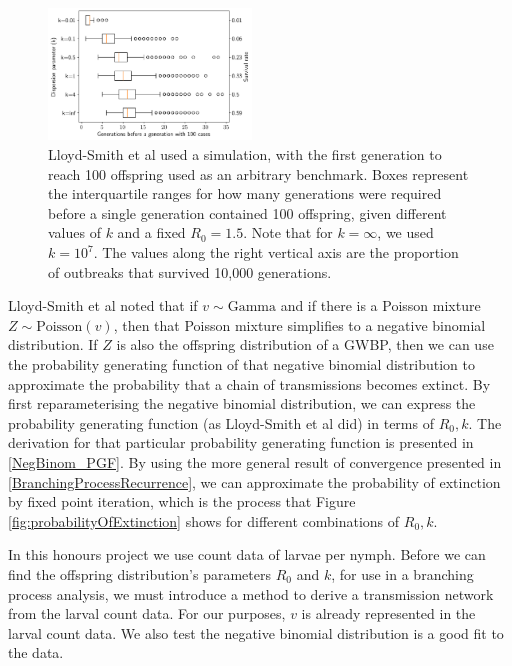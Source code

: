 \documentclass{article}
\begin{document}
\begin{figure}[]
	\begin{mdframed}[backgroundcolor=grey250,rightline=false,leftline=false,topline=false]
    \includegraphics[width=0.48\textwidth, center]{2c_firstGenerationReach100Offspring.png}
    \caption{Lloyd-Smith et al used a simulation, with the first generation to reach 100 offspring used as an arbitrary benchmark. Boxes represent the interquartile ranges for how many generations were required before a single generation contained 100 offspring, given different values of $ k $ and a fixed $ R_0=1.5 $. Note that for $ k = \infty $, we used $ k=10^7 $. The values along the right vertical axis are the proportion of outbreaks that survived 10,000 generations.}
    \label{fig:firstGenerationToReach100Offspring}
	\end{mdframed}
\end{figure}

Lloyd-Smith et al noted that if $ v \sim \text{Gamma} $ and if there is a Poisson mixture $ Z \sim \text{Poisson}(v) $, then that Poisson mixture simplifies to a negative binomial distribution. If $ Z $ is also the offspring distribution of a GWBP, then we can use the probability generating function of that negative binomial distribution to approximate the probability that a chain of transmissions becomes extinct. By first reparameterising the negative binomial distribution, we can express the probability generating function (as Lloyd-Smith et al did) in terms of $ R_0, k $. The derivation for that particular probability generating function is presented in \eqref{NegBinom_PGF}. By using the more general result of convergence presented in \eqref{BranchingProcessRecurrence}, we can approximate the probability of extinction by fixed point iteration, which is the process that Figure \ref{fig:probabilityOfExtinction} shows for different combinations of $ R_0, k $.

In this honours project we use count data of larvae per nymph. Before we can find the offspring distribution's parameters $ R_0 $ and $ k $, for use in a branching process analysis, we must introduce a method to derive a transmission network from the larval count data. For our purposes, $ v $ is already represented in the larval count data. We also test the negative binomial distribution is a good fit to the data.
\end{document}

